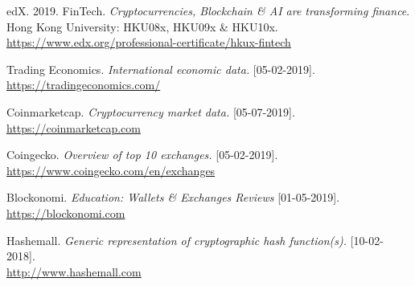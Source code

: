\begin{thebibliography}{25}
edX. 2019. FinTech. \emph{Cryptocurrencies, Blockchain \& AI are transforming finance}. 
Hong Kong University: HKU08x, HKU09x \& HKU10x.\\ \url{https://www.edx.org/professional-certificate/hkux-fintech}

Trading Economics. \emph{International economic data.} [05-02-2019].\\
\url{https://tradingeconomics.com/}


Coinmarketcap. \emph{Cryptocurrency market data.} [05-07-2019].\\
\url{https://coinmarketcap.com}

Coingecko. \emph{Overview of top 10 exchanges.} [05-02-2019].\\
\url{https://www.coingecko.com/en/exchanges}

Blockonomi. \emph{Education: Wallets \& Exchanges Reviews} [01-05-2019].\\
\url{https://blockonomi.com}

Hashemall. \emph{Generic representation of cryptographic hash function(s).} [10-02-2018].\\
\url{http://www.hashemall.com}


 
 
\end{thebibliography}

